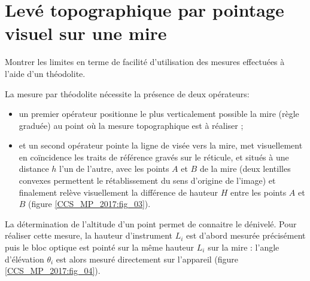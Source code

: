 \section{Levé topographique par pointage visuel sur une mire \label{CCS_MP_2017:p2}}
\begin{obj}
Montrer les limites en terme de facilité d'utilisation des mesures effectuées à l'aide d'un théodolite.
\end{obj}

La mesure par théodolite nécessite la présence de deux opérateurs:
\begin{itemize}
  \item un premier opérateur positionne le plus verticalement possible la mire (règle graduée) au point où la mesure topographique est à réaliser ;
  \item et un second opérateur pointe la ligne de visée vers la mire, met visuellement en coïncidence les traits de référence gravés sur le réticule, et situés à une distance $h$ l'un de l'autre, avec les points $A$ et $B$ de la mire (deux lentilles convexes permettent le rétablissement du sens d'origine de l'image) et finalement relève visuellement la différence de hauteur $H$ entre les points $A$ et $B$ (figure \ref{CCS_MP_2017:fig_03}).
  \end{itemize}

\ifprof
\begin{corrige}
\end{corrige}
\else
\fi

La détermination de l'altitude d'un point permet de connaitre le dénivelé. Pour réaliser cette mesure, la hauteur d'instrument $L_{i}$ est d'abord mesurée précisément puis le bloc optique est pointé sur la même hauteur $L_{i}$ sur la mire : l'angle d'élévation $\theta_{i}$ est alors mesuré directement sur l'appareil (figure \ref{CCS_MP_2017:fig_04}).\\


\ifprof
\begin{corrige}
\end{corrige}
\else
\fi

